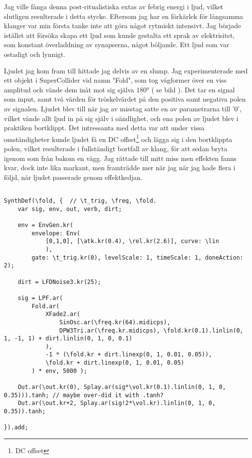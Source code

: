 \documentclass{article}
\begin{document}
  Jag ville fånga denna post-ritualistiska extas av febrig energi i ljud, vilket slutligen resulterade i detta
  stycke. Eftersom jag har en förkärlek för långsamma klanger var min första tanke inte att göra något
  rytmiskt intensivt. Jag började istället att försöka skapa ett ljud som kunde gestalta ett sprak av
  elektrisitet, som konstant överladdning av synapserna, något böljande. Ett ljud som var ostadigt och
  lynnigt. 

  Ljudet jag kom fram till hittade jag delvis av en slump. Jag experimenterade med ett objekt i
  SuperCollider vid namn "Fold", som tog vågformer över en viss amplitud och vände dem inåt mot sig själva
  180° ( se bild ). Det tar en signal som input, samt två värden för tröskelvärdet på den positiva samt
  negativa polen av signalen. Ljudet blev till när jag av misstag satte en av parametrarna till '0', vilket
  vände allt ljud in på sig själv i oändlighet, och ena polen av ljudet blev i praktiken bortklippt. Det
  intressanta med detta var att under vissa omständigheter kunde ljudet få en DC offset\footnote{DC offset}
  och lägga sig i den bortklippta polen, vilket resulterade i fullständigt bortfall av klang, för att sedan
  bryta igenom som från bakom en vägg. Jag rättade till mitt miss men effekten fanns kvar, dock inte lika
  markant, men framträdde mer när jag när jag hade flera i följd, när ljudet passerade genom effektkedjan.

\begin{lstlisting}[style=SuperCollider-IDE, caption=Fold-synt]

SynthDef(\fold, {  // \t_trig, \freq, \fold.
	var sig, env, out, verb, dirt;

	env = EnvGen.kr(
		envelope: Env(
			[0,1,0], [\atk.kr(0.4), \rel.kr(2.6)], curve: \lin
			), 
		gate: \t_trig.kr(0), levelScale: 1, timeScale: 1, doneAction: 2);

	dirt = LFDNoise3.kr(25);

	sig = LPF.ar( 
		Fold.ar(
			XFade2.ar(
				SinOsc.ar(\freq.kr(64).midicps), 
				DPW3Tri.ar(\freq.kr.midicps), \fold.kr(0.1).linlin(0, 1, -1, 1) + dirt.linlin(0, 1, 0, 0.1)
			),
			-1 * (\fold.kr + dirt.linexp(0, 1, 0.01, 0.05)),
			\fold.kr + dirt.linexp(0, 1, 0.01, 0.05)
		) * env, 5000 );

	Out.ar(\out.kr(0), Splay.ar(sig*\vol.kr(0.1).linlin(0, 1, 0, 0.35))).tanh; // maybe over-did it with .tanh?
	Out.ar(\out.kr+2, Splay.ar(sig!2*\vol.kr).linlin(0, 1, 0, 0.35)).tanh;

}).add;
\end{lstlisting}
\end{document}
